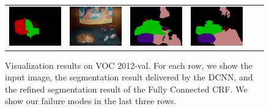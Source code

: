 \begin{figure}[!htbp]
{\begin{tabular}{c c c | c c c}
    \includegraphics[height=0.12\linewidth]{fig/res_crf/2007_000452.png} &
    \includegraphics[height=0.12\linewidth]{fig/img/2007_002268.jpg} &
    \includegraphics[height=0.12\linewidth]{fig/res_none/2007_002268.png} &
    \includegraphics[height=0.12\linewidth]{fig/res_crf/2007_002268.png} \\
  \end{tabular}
  }
  \caption{Visualization results on VOC 2012-val. For each row, we show the input image, the segmentation result delivered by the DCNN, and the refined segmentation result of the Fully Connected CRF. We show our failure modes in the last three rows.} 
  \label{fig:ValResults}
\end{figure}
